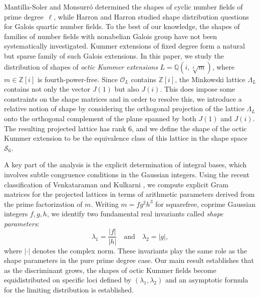 \documentclass{amsart}
\newcommand{\Z}{\mathbb{Z}}
\theoremstyle{plain}
\theoremstyle{definition}
\theoremstyle{remark}
\numberwithin{equation}{section}
\begin{document}
\par Mantilla-Soler and Monsurró \cite{MSM16} determined the shapes of cyclic
number fields of prime degree~$\ell$, while Harron and Harron
\cite{harronharrongaloisquartic} studied shape distribution questions for
Galois quartic number fields. To the best of our knowledge, the shapes of families of number fields with
nonabelian Galois group have not been systematically investigated.
Kummer extensions of fixed degree form a natural but sparse family of such
Galois extensions.
In this paper, we study the distribution of shapes of \emph{octic Kummer
extensions} $L=\mathbb{Q}(i,\sqrt[4]{m})$, where $m\in\mathbb{Z}[i]$ is
fourth-power-free. Since $\mathcal{O}_L$ contains $\Z[i]$, the Minkowski lattice \( \Lambda_L \) contains not only the vector \( J(1) \) but also \( J(i) \). This does impose some constraints on the shape matrices and in order to resolve this, we introduce a relative notion of shape by considering the orthogonal projection of the lattice $\Lambda_L$ onto the orthogonal complement of the plane spanned by both $J(1)$ and $J(i)$. The resulting projected lattice has rank 6, and we define the shape of the octic Kummer extension to be the equivalence class of this lattice in the shape space $\mathcal S_6$.

\par A key part of the analysis is the explicit determination of integral bases, which involves subtle congruence conditions in the Gaussian integers. Using the recent classification of Venkataraman and Kulkarni \cite{quartickummer}, we compute explicit Gram matrices for the projected lattices in terms of arithmetic parameters derived from the prime factorization of $m$. Writing $m = fg^2h^3$ for squarefree, coprime Gaussian integers $f, g, h$, we identify two fundamental real invariants called \emph{shape parameters}:
\[
\lambda_1 = \frac{|f|}{|h|} \quad \text{and} \quad \lambda_2 = |g|,
\]
where $|\cdot|$ denotes the complex norm. These invariants play the same role as the shape parameters in the pure prime degree case. Our main result establishes that as the discriminant grows, the shapes of octic Kummer fields become equidistributed on specific loci defined by $(\lambda_1, \lambda_2)$ and an asymptotic formula for the limiting distribution is established.
\end{document}
